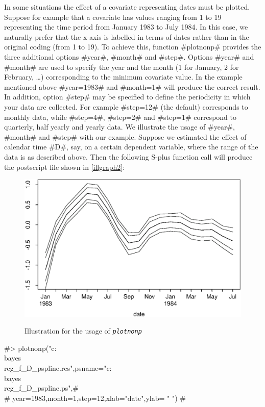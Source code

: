 In some situations the effect of a covariate representing dates
must be plotted. Suppose for example that a covariate has values
ranging from 1 to 19 representing the time period from January
1983 to July 1984. In this case, we naturally prefer that the
x-axis is labelled in terms of dates rather than in the original
coding (from 1 to 19). To achieve this, function #plotnonp#
provides the three additional options #year#, #month# and #step#.
Options #year# and #month# are used to specify the year and the
month (1 for January, 2 for February, \dots) corresponding to the
minimum covariate value. In the example mentioned above
#year=1983# and #month=1# will produce the correct result. In
addition, option #step# may be specified to define the periodicity
in which your data are collected. For example #step=12# (the
default) corresponds to monthly data, while #step=4#, #step=2# and
#step=1# correspond to quarterly, half yearly and yearly data. We
illustrate the usage of #year#, #month# and #step# with our
example. Suppose we estimated the effect of calendar time #D#,
say, on a certain dependent variable, where the range of the data
is as described above. Then the following S-plus function call
will produce the postscript file shown in \autoref{illgraph2}:

\begin{figure}[ht]
\begin{center}
\includegraphics[scale=0.8]{grafiken/plotnonpdate.eps}
{\em\caption{ \label{illgraph2} Illustration for the usage of
\em\tt plotnonp}}
\end{center}
\end{figure}

#> plotnonp("c:\\bayes\\reg_f_D_pspline.res",psname="c:\\bayes\\reg_f_D_pspline.ps",#\\
#  year=1983,month=1,step=12,xlab="date",ylab= " ") #

